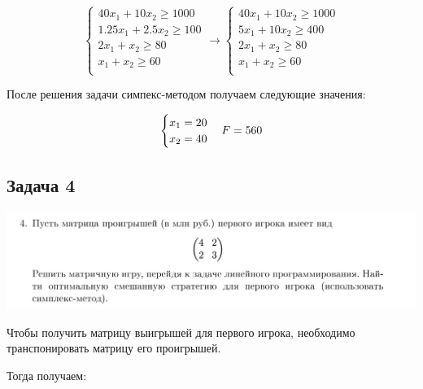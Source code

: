 \documentclass[11pt, a4paper]{article}
\begin{document}
    \begin{equation}
        \begin{cases}
            40x_1 + 10x_2 \geqslant 1000\\
            1.25x_1 + 2.5x_2 \geqslant 100\\
            2x_1 + x_2 \geqslant 80\\
            x_1 + x_2 \geqslant 60\\
        \end{cases}\label{eq:equation18}
        \rightarrow
        \begin{cases}
            40x_1 + 10x_2 \geqslant 1000\\
            5x_1 + 10x_2 \geqslant 400\\
            2x_1 + x_2 \geqslant 80\\
            x_1 + x_2 \geqslant 60\\
        \end{cases}
    \end{equation}

    После решения задачи симпекс-методом получаем следующие значения:

    \begin{equation}
        \begin{cases}
            x_1 = 20\\
            x_2 = 40\\
        \end{cases}\label{eq:equation19}
        \newline
        F = 560
    \end{equation}

    \newpage

    \subsection{Задача 4}\label{subsec:task4}
    \includegraphics[width=1\textwidth]{docs/4}

    Чтобы получить матрицу выигрышей для первого игрока, необходимо
    транспонировать матрицу его проигрышей.

    Тогда получаем:
\end{document}

